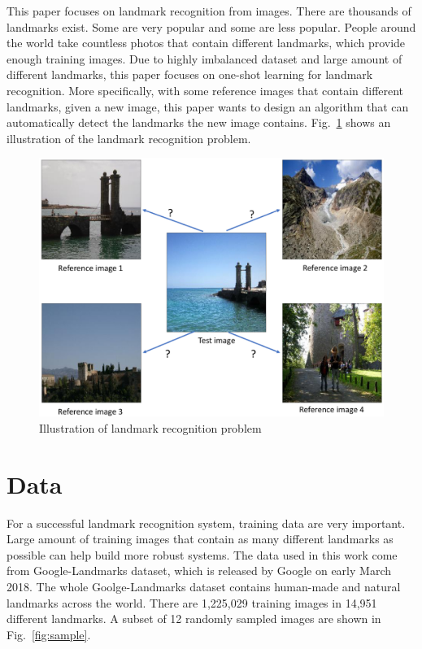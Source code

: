 \documentclass[final,3p]{elsarticle}
\begin{document}
This paper focuses on landmark recognition from images. There are thousands of landmarks exist. Some are very popular and some are less popular. People around the world take countless photos that contain different landmarks, which provide enough training images. Due to highly imbalanced dataset and large amount of different landmarks, this paper focuses on one-shot learning for landmark recognition. More specifically, with some reference images that contain different landmarks, given a new image, this paper wants to design an algorithm that can automatically detect the landmarks the new image contains. Fig.~\ref{fig:problem} shows an illustration of the landmark recognition problem.

\begin{figure}[hbtp]
\centering\includegraphics[width=0.8\linewidth]{./figures/problem.pdf}
\caption{Illustration of landmark recognition problem}
\label{fig:problem}
\end{figure}

\section{Data}
\label{S:data}

For a successful landmark recognition system, training data are very important. Large amount of training images that contain as many different landmarks as possible can help build more robust systems. The data used in this work come from Google-Landmarks dataset, which is released by Google on early March 2018. The whole Goolge-Landmarks dataset contains human-made and natural landmarks across the world. There are 1,225,029 training images in 14,951 different landmarks. A subset of 12 randomly sampled images are shown in Fig.~\ref{fig:sample}.
\end{document}
